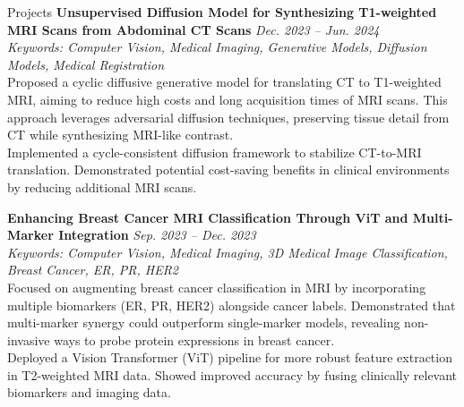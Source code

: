 \documentclass{resume}
\begin{document}
\begin{rSection}{Projects}
\bigskip
\textbf{Unsupervised Diffusion Model for Synthesizing T1-weighted MRI Scans from Abdominal CT Scans} \hfill \textit{Dec. 2023 -- Jun. 2024} \\
\textit{Keywords: Computer Vision, Medical Imaging, Generative Models, Diffusion Models, Medical Registration} \quad
[\href{https://www.dbpia.co.kr/journal/articleDetail?nodeId=NODE11862432}{Paper} $|$ 
\href{https://github.com/janghana/Unsupervised-Diffusion-Model-for-Synthesizing-T1-weighted-MRI-Scans-from-Abdominal-CT-Scans}{Code} $|$ 
\href{https://drive.google.com/file/d/1J3rnoVAd6anQrsf-7kLHkHUhdYOFSOmN/view?usp=drive_link}{Poster}] \\
\hspace*{1em} Proposed a cyclic diffusive generative model for translating CT to T1-weighted MRI, aiming to reduce high costs and long acquisition times of MRI scans. This approach leverages adversarial diffusion techniques, preserving tissue detail from CT while synthesizing MRI-like contrast. \\
\hspace*{1em} Implemented a cycle-consistent diffusion framework to stabilize CT-to-MRI translation.  
\hspace*{1em} Demonstrated potential cost-saving benefits in clinical environments by reducing additional MRI scans.

\bigskip
\textbf{Enhancing Breast Cancer MRI Classification Through ViT and Multi-Marker Integration} \hfill \textit{Sep. 2023 -- Dec. 2023} \\
\textit{Keywords: Computer Vision, Medical Imaging, 3D Medical Image Classification, Breast Cancer, ER, PR, HER2}  \\
\hspace*{1em} Focused on augmenting breast cancer classification in MRI by incorporating multiple biomarkers (ER, PR, HER2) alongside cancer labels. Demonstrated that multi-marker synergy could outperform single-marker models, revealing non-invasive ways to probe protein expressions in breast cancer. \\
\hspace*{1em} Deployed a Vision Transformer (ViT) pipeline for more robust feature extraction in T2-weighted MRI data.  
\hspace*{1em} Showed improved accuracy by fusing clinically relevant biomarkers and imaging data.


\end{rSection}
\end{document}
